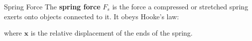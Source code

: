 \documentclass[12pt,compress,aspectratio=169]{beamer}
\begin{document}
\begin{frame}{Spring Force}
  The \textbf{spring force} $F_s$ is the force a compressed or stretched spring
  exerts onto objects connected to it. It obeys Hooke's law:
  
  where $\bm{x}$ is the relative displacement of the ends of the spring.
  \begin{center}
  \end{center}
\end{frame}





\end{document}
